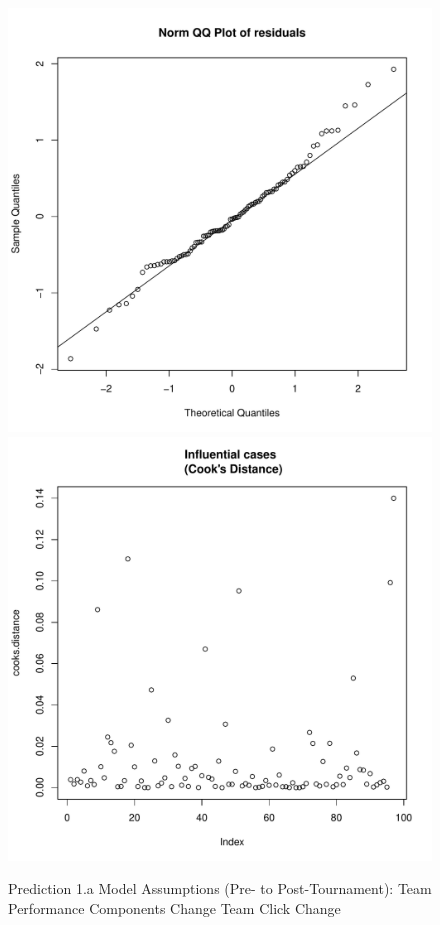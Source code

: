 \begin{CJK}{UTF8}{gbsn}
\begin{figure}[htbp]
   \includegraphics[scale =.4]{images/MLM21aQQNorm.pdf}
   \includegraphics[scale =.4]{images/MLM21aCooksD.pdf}
   \caption{Prediction 1.a Model Assumptions (Pre- to Post-Tournament): Team Performance Components Change Team Click Change}
   \label{fig:MLM21aAssumptions}
 \end{figure}



\end{CJK}
